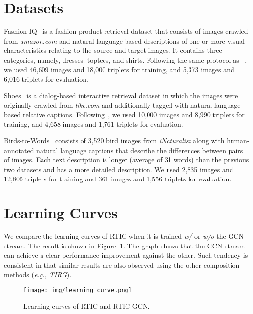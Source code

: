 \documentclass[10pt,twocolumn,letterpaper]{article}
\begin{document}
\section{Datasets}

Fashion-IQ~\cite{guo2019fashion} is a fashion product retrieval dataset that consists of images crawled from \textit{amazon.com} and natural language-based descriptions of one or more visual characteristics relating to the source and target images. It contains three categories, namely, dresses, toptees, and shirts. Following the same protocol as ~\cite{guo2019fashion}, we used 46,609 images and 18,000 triplets for training, and 5,373 images and 6,016 triplets for evaluation.

Shoes~\cite{guo2018dialog} is a dialog-based interactive retrieval dataset in which the images were originally crawled from \textit{like.com} and additionally tagged with natural language-based relative captions. Following~\cite{guo2018dialog}, we used 10,000 images and 8,990 triplets for training, and 4,658 images and 1,761 triplets for evaluation.

Birds-to-Words~\cite{forbes2019neural} consists of 3,520 bird images from \textit{iNaturalist} along with human-annotated natural language captions that describe the differences between pairs of images. Each text description is longer (average of 31 words) than the previous two datasets and has a more detailed description. We used 2,835 images and 12,805 triplets for training and 361 images and 1,556 triplets for evaluation.


\section{Learning Curves}
We compare the learning curves of RTIC when it is trained \textit{w/} or \textit{w/o} the GCN stream. The result is shown in Figure~\ref{fig:learning_curve}. The graph shows that the GCN stream can achieve a clear performance improvement against the other. Such tendency is consistent in that similar results are also observed using the other composition methods (\textit{e.g., TIRG}).

\begin{figure}[H]
    \begin{center}
	    \texttt{[image: img/learning\_curve.png]}
	\end{center}
	\caption{Learning curves of RTIC and RTIC-GCN.}
	\label{fig:learning_curve}
\end{figure}
\end{document}
